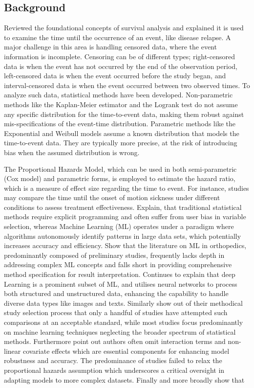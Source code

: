 \subsection{Background} 
\noindent \parencite{burzykowski_survival_2024} Reviewed the foundational concepts of survival analysis and explained it is used to examine the time until the occurrence of an event, like disease relapse. A major challenge in this area is handling censored data, where the event information is incomplete. Censoring can be of different types; right-censored data is when the event has not occurred by the end of the observation period, left-censored data is when the event occurred before the study began, and interval-censored data is when the event occurred between two observed times. To analyze such data, statistical methods have been developed.\parencite{burzykowski_survival_2024} Non-parametric methods like the Kaplan-Meier estimator and the Logrank test do not assume any specific distribution for the time-to-event data, making them robust against mis-specifications of the event-time distribution. Parametric methods like the Exponential and Weibull models assume a known distribution that models the time-to-event data. They are typically more precise, at the risk of introducing bias when the assumed distribution is wrong. \par \noindent The Proportional Hazards Model, which can be used in both semi-parametric (Cox model) and parametric forms, is employed to estimate the hazard ratio, which is a measure of effect size regarding the time to event. For instance, studies may compare the time until the onset of motion sickness under different conditions to assess treatment effectiveness. \parencite{polce_guide_2023} Explain, that traditional statistical methods require explicit programming and often suffer from user bias in variable selection, whereas Machine Learning (ML) operates under a paradigm where algorithms autonomously identify patterns in large data sets, which potentially increases accuracy and efficiency. \parencite{polce_guide_2023} Show that the literature on ML in orthopedics, predominantly composed of preliminary studies, frequently lacks depth in addressing complex ML concepts and falls short in providing comprehensive method specification for result interpretation. \parencite{polce_guide_2023} Continues to explain that deep Learning is a prominent subset of ML, and utilises neural networks to process both structured and unstructured data, enhancing the capability to handle diverse data types like images and texts. Similarly \parencite{smith_scoping_2022} show out of their methodical study selection process that only a handful of studies have attempted such comparisons at an acceptable standard, while most studies focus predominantly on machine learning techniques neglecting the broader spectrum of statistical methods. Furthermore \parencite{smith_scoping_2022} point out authors often omit interaction terms and non-linear covariate effects which are essential components for enhancing model robustness and accuracy. The predominance of studies failed to relax the proportional hazards assumption which underscores a critical oversight in adapting models to more complex datasets. Finally and more broadly \parencite{smith_scoping_2022} show that 
